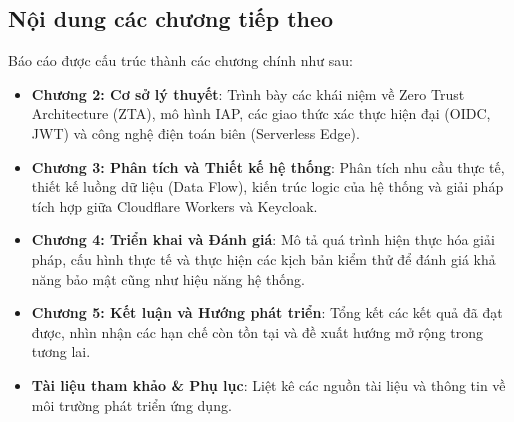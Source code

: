 \subsection{Nội dung các chương tiếp theo}
Báo cáo được cấu trúc thành các chương chính như sau:
\begin{itemize}
\item \textbf{Chương 2: Cơ sở lý thuyết}: Trình bày các khái niệm về Zero Trust Architecture (ZTA), mô hình IAP, các giao thức xác thực hiện đại (OIDC, JWT) và công nghệ điện toán biên (Serverless Edge).
\item \textbf{Chương 3: Phân tích và Thiết kế hệ thống}: Phân tích nhu cầu thực tế, thiết kế luồng dữ liệu (Data Flow), kiến trúc logic của hệ thống và giải pháp tích hợp giữa Cloudflare Workers và Keycloak.
\item \textbf{Chương 4: Triển khai và Đánh giá}: Mô tả quá trình hiện thực hóa giải pháp, cấu hình thực tế và thực hiện các kịch bản kiểm thử để đánh giá khả năng bảo mật cũng như hiệu năng hệ thống.
\item \textbf{Chương 5: Kết luận và Hướng phát triển}: Tổng kết các kết quả đã đạt được, nhìn nhận các hạn chế còn tồn tại và đề xuất hướng mở rộng trong tương lai.
\item \textbf{Tài liệu tham khảo \& Phụ lục}: Liệt kê các nguồn tài liệu và thông tin về môi trường phát triển ứng dụng.
\end{itemize}

